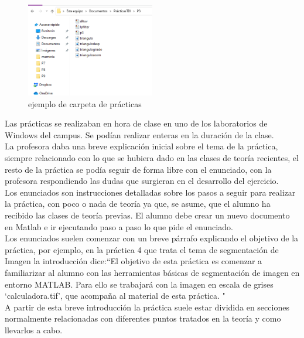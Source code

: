 \documentclass[a4paper,12pt]{report}
\begin{document}
\begin{figure}[h]
\centering
\includegraphics[width=0.5\textwidth]{imagenes/carpetapracticas}
\caption{ejemplo de carpeta de prácticas}
\label{carpetapracticas}
\end{figure}

Las prácticas se realizaban en hora de clase en uno de los laboratorios de Windows del campus. Se podían realizar enteras en la duración de la clase. \\

La profesora daba una breve explicación inicial sobre el tema de la práctica, siempre relacionado con lo que se hubiera dado en las clases de teoría recientes, el resto de la práctica se podía seguir de forma libre con el enunciado, con la profesora respondiendo las dudas que surgieran en el desarrollo del ejercicio. \\

Los enunciados son instrucciones detalladas sobre los pasos a seguir para realizar la práctica, con poco o nada de teoría ya que, se asume, que el alumno ha recibido las clases de teoría previas. El alumno debe crear un nuevo documento en Matlab e ir ejecutando paso a paso lo que pide el enunciado. \\

Los enunciados suelen comenzar con un breve párrafo explicando el objetivo de la práctica, por ejemplo, en la práctica 4 que trata el tema de segmentación de Imagen la introducción dice:``El objetivo de esta práctica es comenzar a familiarizar al alumno con las herramientas básicas de segmentación de imagen en entorno MATLAB. Para ello se trabajará con la imagen en escala de
grises ‘calculadora.tif’, que acompaña al material de esta práctica. "\\

A partir de esta breve introducción la práctica suele estar dividida en secciones normalmente relacionadas con diferentes puntos tratados en la teoría y como llevarlos a cabo.\\
\end{document}
